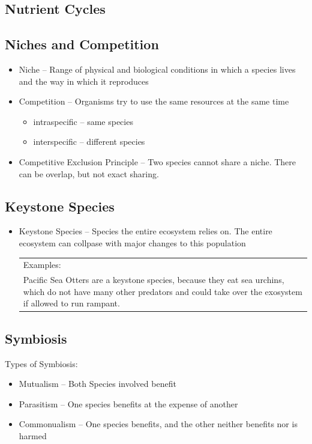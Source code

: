 \documentclass{article}
\begin{document}
\subsection{Nutrient Cycles}

\subsection{Niches and Competition}
\begin{itemize}
\item Niche -- Range of physical and biological conditions in which a species lives and the way in which it reproduces
\item Competition -- Organisms try to use the same resources at the same time
\begin{itemize}
\item intraspecific -- same species
\item interspecific -- different species
\end{itemize}
\item Competitive Exclusion Principle -- Two species cannot share a niche. There can be overlap, but not exact sharing.
\end{itemize}

\subsection{Keystone Species}
\begin{itemize}
\item Keystone Species -- Species the entire ecosystem relies on. The entire ecosystem can collpase with major changes to this population\\
\begin{tabular}{| p{10cm}}
Examples:\\
Pacific Sea Otters are a keystone species,  because they eat sea urchins, which do not have many other predators and could take over the exosystem if allowed to run rampant.
\end{tabular}
\end{itemize}

\subsection{Symbiosis}
Types of Symbiosis:
\begin{itemize}
\item Mutualism -- Both Species involved benefit
\item Parasitism -- One species benefits at the expense of another
\item Commonualism -- One species benefits, and the other neither benefits nor is harmed
\end{itemize}
\end{document}
